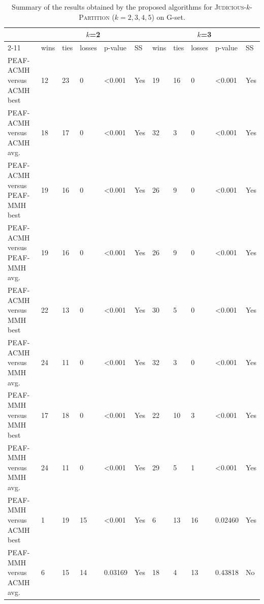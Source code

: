 \documentclass[12pt, a4paper]{article}%
\renewcommand{\arraystretch}{1.3}
\numberwithin{equation}{section}
\theoremstyle{plain}
\begin{document}
				{
					\scriptsize
					\setlength{\tabcolsep}{10pt}
					\renewcommand{\arraystretch}{1.6}
					\begin{landscape}
						\begin{longtable}{|l|lllll|lllll|}
							\caption[Summary for \textsc{Judicious}-$k$-\textsc{Partition}]{Summary of the results obtained by the proposed algorithms for \textsc{Judicious}-$k$-\textsc{Partition} ($k=2,3,4,5$) on G-set.}
							\label{tab::jp-summary}\\
							\hline
							\multicolumn{1}{|c|}{\multirow{2}{*}{}} & \multicolumn{5}{c|}{$k$=2}                    & \multicolumn{5}{c|}{$k$=3}                    \\ \cline{2-11} 
							\multicolumn{1}{|c|}{}                  & wins & ties & losses & p-value          & SS  & wins & ties & losses & p-value          & SS  \\ \hline
							PEAF-ACMH versus ACMH best             & 12   & 23   & 0      & \textless{}0.001 & Yes & 19   & 16   & 0      & \textless{}0.001 & Yes \\
							PEAF-ACMH versus ACMH avg.             & 18   & 17   & 0      & \textless{}0.001 & Yes & 32   & 3    & 0      & \textless{}0.001 & Yes \\
							PEAF-ACMH versus PEAF-MMH best           & 19   & 16   & 0      & \textless{}0.001 & Yes & 26   & 9    & 0      & \textless{}0.001 & Yes \\
							PEAF-ACMH versus PEAF-MMH avg.           & 19   & 16   & 0      & \textless{}0.001 & Yes & 26   & 9    & 0      & \textless{}0.001 & Yes \\
							PEAF-ACMH versus MMH best               & 22   & 13   & 0      & \textless{}0.001 & Yes & 30   & 5    & 0      & \textless{}0.001 & Yes \\
							PEAF-ACMH versus MMH avg.               & 24   & 11   & 0      & \textless{}0.001 & Yes & 32   & 3    & 0      & \textless{}0.001 & Yes \\
							PEAF-MMH versus MMH best                 & 17   & 18   & 0      & \textless{}0.001 & Yes & 22   & 10   & 3      & \textless{}0.001 & Yes \\
							PEAF-MMH versus MMH avg.                 & 24   & 11   & 0      & \textless{}0.001 & Yes & 29   & 5    & 1      & \textless{}0.001 & Yes \\
							PEAF-MMH versus ACMH best               & 1    & 19   & 15     & \textless{}0.001 & Yes & 6    & 13   & 16     & 0.02460          & Yes \\
							PEAF-MMH versus ACMH avg.               & 6    & 15   & 14     & 0.03169          & Yes & 18   & 4    & 13     & 0.43818          & No  \\

\end{longtable}
\end{landscape}}
\end{document}
